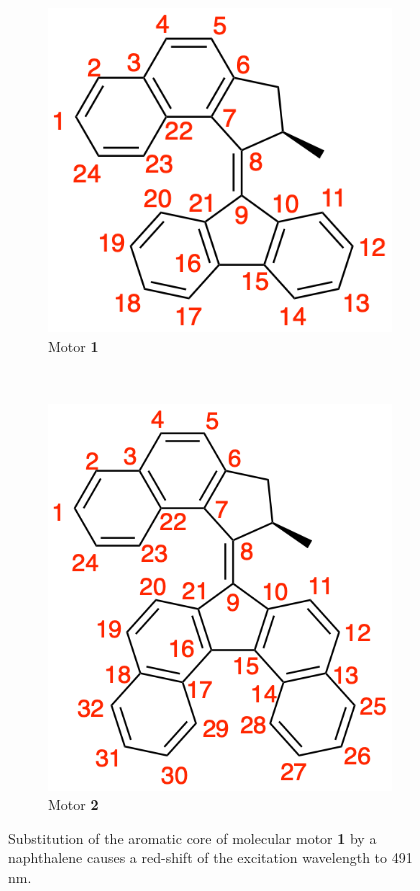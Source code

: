 \documentclass{article}
\begin{document}
\begin{figure}[h]
\centering
\begin{subfigure}[b]{0.5\textwidth}
\centering
\includegraphics[scale=1.0]{./images/mm1_labels.png}
\caption{Motor \textbf{1}}
\end{subfigure}~
\begin{subfigure}[b]{0.5\textwidth}
\centering
\includegraphics[scale=1.0]{./images/mm2_labels.png}
\caption{Motor \textbf{2}}
\end{subfigure}
\caption{Substitution of the aromatic core of molecular motor \textbf{1} by a naphthalene causes a red-shift of the excitation wavelength to 491 nm.}
\label{fig:mm2}
\end{figure} 
\end{document}
